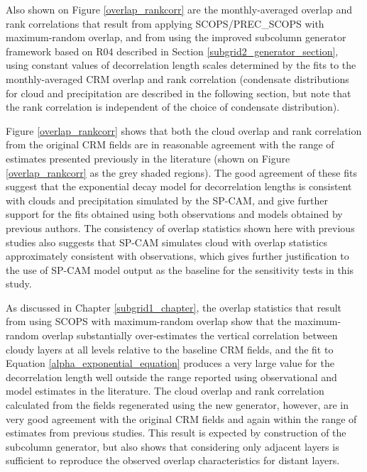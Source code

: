 Also shown on Figure \ref{overlap_rankcorr} are the monthly-averaged overlap and rank correlations that result from applying SCOPS/PREC\_SCOPS with maximum-random overlap, and from using the improved subcolumn generator framework based on R04 described in Section \ref{subgrid2_generator_section}, using constant values of decorrelation length scales determined by the fits to the monthly-averaged CRM overlap and rank correlation (condensate distributions for cloud and precipitation are described in the following section, but note that the rank correlation is independent of the choice of condensate distribution).

Figure \ref{overlap_rankcorr} shows that both the cloud overlap and rank correlation from the original CRM fields are in reasonable agreement with the range of estimates presented previously in the literature (shown on Figure \ref{overlap_rankcorr} as the grey shaded regions). The good agreement of these fits suggest that the exponential decay model for decorrelation lengths is consistent with clouds and precipitation simulated by the SP-CAM, and give further support for the fits obtained using both observations and models obtained by previous authors. The consistency of overlap statistics shown here with previous studies also suggests that SP-CAM simulates cloud with overlap statistics approximately consistent with observations, which gives further justification to the use of SP-CAM model output as the baseline for the sensitivity tests in this study.

As discussed in Chapter \ref{subgrid1_chapter}, the overlap statistics that result from using SCOPS with maximum-random overlap show that the maximum-random overlap substantially over-estimates the vertical correlation between cloudy layers at all levels relative to the baseline CRM fields, and the fit to Equation \ref{alpha_exponential_equation} produces a very large value for the decorrelation length well outside the range reported using observational and model estimates in the literature. The cloud overlap and rank correlation calculated from the fields regenerated using the new generator, however, are in very good agreement with the original CRM fields and again within the range of estimates from previous studies. This result is expected by construction of the subcolumn generator, but also shows that considering only adjacent layers is sufficient to reproduce the observed overlap characteristics for distant layers.

